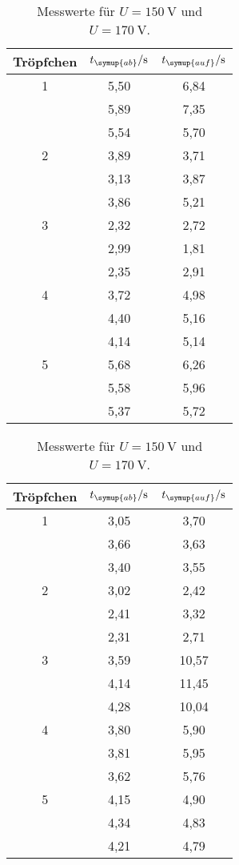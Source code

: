 \begin{table}
  \centering
  \caption{Messwerte für $U=\SI{150}{\volt}$ und
  $U=\SI{170}{\volt}$.}
  \label{tab:t12}
  \begin{tabular}{c c c}
    \toprule
    Tröpfchen & $t_{\symup{ab}}/\unit{\second}$ & $t_{\symup{auf}}/\unit{\second}$ \\
    \midrule
    1 & 5,50 & 6,84 \\
      & 5,89 & 7,35 \\
      & 5,54 & 5,70 \\
    2 & 3,89 & 3,71 \\
      & 3,13 & 3,87 \\
      & 3,86 & 5,21 \\
    3 & 2,32 & 2,72 \\
      & 2,99 & 1,81 \\
      & 2,35 & 2,91 \\
    4 & 3,72 & 4,98 \\
      & 4,40 & 5,16 \\
      & 4,14 & 5,14 \\
    5 & 5,68 & 6,26 \\
      & 5,58 & 5,96 \\
      & 5,37 & 5,72 \\
    \bottomrule
  \end{tabular}
  \quad
  \begin{tabular}{c c c}
    \toprule
    Tröpfchen & $t_{\symup{ab}}/\unit{\second}$ & $t_{\symup{auf}}/\unit{\second}$ \\
    \midrule
    1 & 3,05 &  3,70 \\
      & 3,66 &  3,63 \\
      & 3,40 &  3,55 \\
    2 & 3,02 &  2,42 \\
      & 2,41 &  3,32 \\
      & 2,31 &  2,71 \\
    3 & 3,59 & 10,57 \\
      & 4,14 & 11,45 \\
      & 4,28 & 10,04 \\
    4 & 3,80 &  5,90 \\
      & 3,81 &  5,95 \\
      & 3,62 &  5,76 \\
    5 & 4,15 &  4,90 \\
      & 4,34 &  4,83 \\
      & 4,21 &  4,79 \\
    \bottomrule
  \end{tabular}
\end{table}

